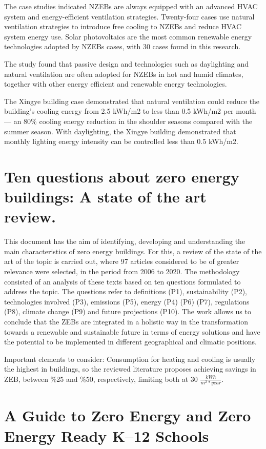 The case studies indicated NZEBs are always equipped with an advanced HVAC system and energy-efficient ventilation strategies. Twenty-four cases use natural ventilation strategies to introduce free cooling to NZEBs and reduce HVAC system energy use. Solar photovoltaics are the most common renewable energy technologies adopted by NZEBs cases, with 30 cases found in this research.

The study found that passive design and technologies such as daylighting and natural ventilation are often adopted for NZEBs in hot and humid climates, together with other energy efficient and renewable energy technologies. 

The Xingye building case demonstrated that natural ventilation could reduce the building's cooling energy from 2.5 kWh/m2 to less than 0.5 kWh/m2 per month — an 80\% cooling energy reduction in the shoulder seasons compared with the summer season. With daylighting, the Xingye building demonstrated that monthly lighting energy intensity can be controlled less than 0.5 kWh/m2.

\section{Ten questions about zero energy buildings: A state of the art review.}
This document has the aim of identifying, developing and understanding the main characteristics of zero energy buildings. For this, a review of the state of the art of the topic is carried out, where 97 articles considered to be of greater relevance were selected, in the period from 2006 to 2020. The methodology consisted of an analysis of these texts based on ten questions formulated to address the topic. The questions refer to definitions (P1), sustainability (P2), technologies involved (P3), emissions (P5), energy (P4) (P6) (P7), regulations (P8), climate change (P9) and future projections (P10). The work allows us to conclude that the ZEBs are integrated in a holistic way in the transformation towards a renewable and sustainable future in terms of energy solutions and have the potential to be implemented in different geographical and climatic positions.


Important elements to consider: Consumption for heating and cooling is usually the highest in buildings, so the reviewed literature proposes achieving savings in ZEB, between $\%$25 and $\%$50, respectively, limiting both at 30 $\frac{kWh}{m^{2}*year}$.


\section{A Guide to Zero Energy and Zero Energy Ready K–12 Schools}

